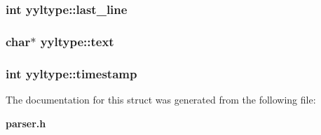 \subsubsection{\setlength{\rightskip}{0pt plus 5cm}int {\bf yyltype::last\_\-line}}\label{structyyltype_o3}


\subsubsection{\setlength{\rightskip}{0pt plus 5cm}char$\ast$ {\bf yyltype::text}}\label{structyyltype_o5}


\subsubsection{\setlength{\rightskip}{0pt plus 5cm}int {\bf yyltype::timestamp}}\label{structyyltype_o0}




The documentation for this struct was generated from the following file:\begin{CompactItemize}
\item 
{\bf parser.h}\end{CompactItemize}
